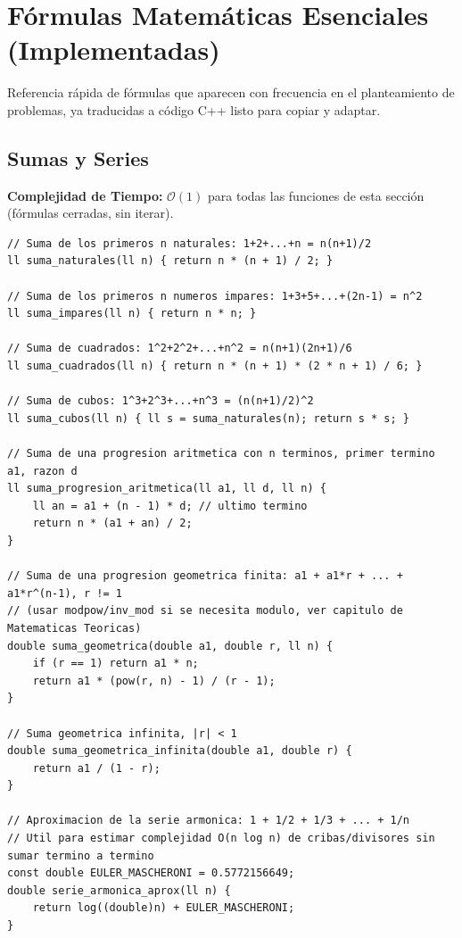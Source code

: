 \documentclass[10pt,twocolumn,letterpaper]{report}
\begin{document}
\chapter{Fórmulas Matemáticas Esenciales (Implementadas)}
Referencia rápida de fórmulas que aparecen con frecuencia en el planteamiento de problemas, ya traducidas a código C++ listo para copiar y adaptar.

\section{Sumas y Series}
\textbf{Complejidad de Tiempo:} $\mathcal{O}(1)$ para todas las funciones de esta sección (fórmulas cerradas, sin iterar).
\begin{lstlisting}
// Suma de los primeros n naturales: 1+2+...+n = n(n+1)/2
ll suma_naturales(ll n) { return n * (n + 1) / 2; }

// Suma de los primeros n numeros impares: 1+3+5+...+(2n-1) = n^2
ll suma_impares(ll n) { return n * n; }

// Suma de cuadrados: 1^2+2^2+...+n^2 = n(n+1)(2n+1)/6
ll suma_cuadrados(ll n) { return n * (n + 1) * (2 * n + 1) / 6; }

// Suma de cubos: 1^3+2^3+...+n^3 = (n(n+1)/2)^2
ll suma_cubos(ll n) { ll s = suma_naturales(n); return s * s; }

// Suma de una progresion aritmetica con n terminos, primer termino a1, razon d
ll suma_progresion_aritmetica(ll a1, ll d, ll n) {
    ll an = a1 + (n - 1) * d; // ultimo termino
    return n * (a1 + an) / 2;
}

// Suma de una progresion geometrica finita: a1 + a1*r + ... + a1*r^(n-1), r != 1
// (usar modpow/inv_mod si se necesita modulo, ver capitulo de Matematicas Teoricas)
double suma_geometrica(double a1, double r, ll n) {
    if (r == 1) return a1 * n;
    return a1 * (pow(r, n) - 1) / (r - 1);
}

// Suma geometrica infinita, |r| < 1
double suma_geometrica_infinita(double a1, double r) {
    return a1 / (1 - r);
}

// Aproximacion de la serie armonica: 1 + 1/2 + 1/3 + ... + 1/n
// Util para estimar complejidad O(n log n) de cribas/divisores sin sumar termino a termino
const double EULER_MASCHERONI = 0.5772156649;
double serie_armonica_aprox(ll n) {
    return log((double)n) + EULER_MASCHERONI;
}
\end{lstlisting}
\end{document}
